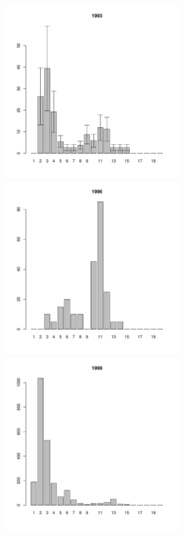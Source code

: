 \documentclass[12pt, a4paper]{article}
\begin{document}
\begin{figure}[h]
\begin{multicols}{3}
\end{multicols}



\begin{multicols}{3}
\hfill
\includegraphics[width=65mm]{../White_Sea/Luvenga_Goreliy/midlow_1993_.pdf}
\hfill
\includegraphics[width=65mm]{../White_Sea/Luvenga_Goreliy/midlow_1996_.pdf}
\hfill
\includegraphics[width=65mm]{../White_Sea/Luvenga_Goreliy/midlow_1999_.pdf}

\end{multicols}



\end{figure}
\end{document}
